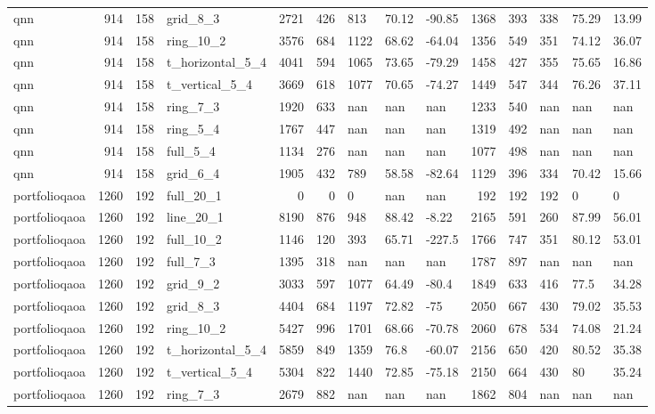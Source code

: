 \begin{longtable}{lrrlrrlllrrlll}
qnn & 914 & 158 & grid\_8\_3 & 2721 & 426 & 813 & 70.12 & -90.85 & 1368 & 393 & 338 & 75.29 & 13.99 \\
qnn & 914 & 158 & ring\_10\_2 & 3576 & 684 & 1122 & 68.62 & -64.04 & 1356 & 549 & 351 & 74.12 & 36.07 \\
qnn & 914 & 158 & t\_horizontal\_5\_4 & 4041 & 594 & 1065 & 73.65 & -79.29 & 1458 & 427 & 355 & 75.65 & 16.86 \\
qnn & 914 & 158 & t\_vertical\_5\_4 & 3669 & 618 & 1077 & 70.65 & -74.27 & 1449 & 547 & 344 & 76.26 & 37.11 \\
qnn & 914 & 158 & ring\_7\_3 & 1920 & 633 & nan & nan & nan & 1233 & 540 & nan & nan & nan \\
qnn & 914 & 158 & ring\_5\_4 & 1767 & 447 & nan & nan & nan & 1319 & 492 & nan & nan & nan \\
qnn & 914 & 158 & full\_5\_4 & 1134 & 276 & nan & nan & nan & 1077 & 498 & nan & nan & nan \\
qnn & 914 & 158 & grid\_6\_4 & 1905 & 432 & 789 & 58.58 & -82.64 & 1129 & 396 & 334 & 70.42 & 15.66 \\
portfolioqaoa & 1260 & 192 & full\_20\_1 & 0 & 0 & 0 & nan & nan & 192 & 192 & 192 & 0 & 0 \\
portfolioqaoa & 1260 & 192 & line\_20\_1 & 8190 & 876 & 948 & 88.42 & -8.22 & 2165 & 591 & 260 & 87.99 & 56.01 \\
portfolioqaoa & 1260 & 192 & full\_10\_2 & 1146 & 120 & 393 & 65.71 & -227.5 & 1766 & 747 & 351 & 80.12 & 53.01 \\
portfolioqaoa & 1260 & 192 & full\_7\_3 & 1395 & 318 & nan & nan & nan & 1787 & 897 & nan & nan & nan \\
portfolioqaoa & 1260 & 192 & grid\_9\_2 & 3033 & 597 & 1077 & 64.49 & -80.4 & 1849 & 633 & 416 & 77.5 & 34.28 \\
portfolioqaoa & 1260 & 192 & grid\_8\_3 & 4404 & 684 & 1197 & 72.82 & -75 & 2050 & 667 & 430 & 79.02 & 35.53 \\
portfolioqaoa & 1260 & 192 & ring\_10\_2 & 5427 & 996 & 1701 & 68.66 & -70.78 & 2060 & 678 & 534 & 74.08 & 21.24 \\
portfolioqaoa & 1260 & 192 & t\_horizontal\_5\_4 & 5859 & 849 & 1359 & 76.8 & -60.07 & 2156 & 650 & 420 & 80.52 & 35.38 \\
portfolioqaoa & 1260 & 192 & t\_vertical\_5\_4 & 5304 & 822 & 1440 & 72.85 & -75.18 & 2150 & 664 & 430 & 80 & 35.24 \\
portfolioqaoa & 1260 & 192 & ring\_7\_3 & 2679 & 882 & nan & nan & nan & 1862 & 804 & nan & nan & nan \\

\end{longtable}
